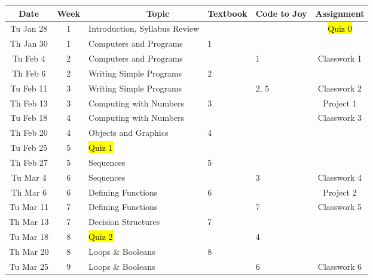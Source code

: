 \documentclass[letter,10pt]{article}
\begin{document}
\begin{comment}
M Nov 25  & 14 & Object Oriented Design & & & Classwork 9 \\
W Nov 27  & 14 & Algorithm Design \& Recursion & & & \\ \hline
M Dec 2   & 15 & Algorithm Design \& Recursion & 13 & & \\
W Dec 4   & 15 & \hl{Quiz 4} \textit{Updated 11/20} & & 9 & Classwork 10 \\
M Dec 9   & 16 & Review & & & \\
W Dec 11  & 16 & \hl{Study Day, no class} & & & \\
M Dec 16  & 17 & \hl{Final Exam, 6-8PM.} & & & \\
\end{tabular}
\end{comment}

\small
\begin{tabular}{c c l l l c}
Date           & Week & ~~~~~~~~~~~~Topic & Textbook & Code to Joy & Assignment \\ \hline
Tu Jan 28  & 1  & Introduction, Syllabus Review & & & \hl{Quiz 0} \\
Th Jan 30  & 1  & Computers and Programs & 1 & & \\ \hline
Tu Feb 4    & 2  & Computers and Programs & & 1 & Classwork 1 \\
Th Feb 6    & 2  & Writing Simple Programs & 2 & & \\
Tu Feb 11  & 3  & Writing Simple Programs & & 2, 5 & Classwork 2 \\
Th Feb 13  & 3  & Computing with Numbers & 3 & & Project 1\\
Tu Feb 18  & 4  & Computing with Numbers & & & Classwork 3 \\
Th Feb 20  & 4  & Objects and Graphics & 4 & & \\
Tu Feb 25  & 5  & \hl{Quiz 1} & & & \\
Th Feb 27  & 5  & Sequences & 5 & & \\ \hline
Tu Mar 4    & 6  & Sequences & & 3 & Classwork 4 \\
Th Mar 6    & 6  & Defining Functions & 6 & & Project 2\\
Tu Mar 11  & 7  & Defining Functions & & 7 & Classwork 5 \\
Th Mar 13  & 7  & Decision Structures & 7 & & \\
Tu Mar 18  & 8  & \hl{Quiz 2} & & 4 & \\
Th Mar 20  & 8  & Loops \& Booleans & 8 & & \\
Tu Mar 25  & 9  & Loops \& Booleans & & 6 & Classwork 6 \\

\end{tabular}
\end{document}
